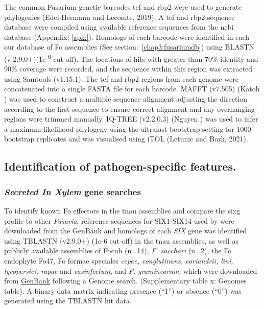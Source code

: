 The common Fusarium genetic barcodes \ac{tef} and \ac{rbp2} were used to generate phylogenies (Edel-Hermann and Lecomte, 2019). A \ac{tef} and \ac{rbp2} sequence database were compiled using available reference sequences from the \ac{ncbi} database (Appendix; \ref{apx:}). Homologs of each barcode were identified in each our database of \ac{Fo} assemblies (See section:~\ref{chap3:fusariumdb}) using BLASTN (v 2.9.0+)(1e-\textsuperscript{6} cut-off). The locations of hits with greater than 70\% identity and 90\% coverage were recorded, and the sequence within this region was extracted using Samtools (v1.15.1). The \ac{tef} and \ac{rbp2} regions from each genome were concatenated into a single FASTA file for each barcode. MAFFT (v7.505) (Katoh ) was used to construct a multiple sequence alignment adjusting the direction according to the first sequence to ensure correct alignment and any overhanging regions were trimmed manually. IQ-TREE (v2.2.0.3) (Nguyen ) was used to infer a maximum-likelihood phylogeny using the ultrafast bootstrap setting for 1000 bootstrap replicates and was visualised using iTOL (Letunic and Bork, 2021). 

\subsection{Identification of pathogen-specific features.}

\subsubsection{\textit{Secreted In Xylem} gene searches}

To identify known \acs{Fo} effectors in the \ac{tnau} assemblies and compare the \ac{sixg} profile to other \textit{Fusaria}, reference sequences for SIX1-SIX14 used by \textcite{Czislowski2018} were downloaded from the GenBank and homologs of each \textit{SIX} gene was identified using TBLASTN (v2.9.0+) (1e-6 cut-off) in the \ac{tnau} assemblies, as well as publicly available assemblies of \ac{Focub} (n=14), \textit{F. sacchari} (n=2), the \ac{Fo} endophyte Fo47, \ac{Fo} formae speciales \textit{cepae, conglutinans, coriandrii, lini, lycopersici,  rapae} and \textit{vasinfectum}, and \textit{F. graminearum}, which were downloaded from \href{https://www.ncbi.nlm.nih.gov/data-hub/genome/}{GenBank} following a Genome search. (Supplementary table x: Genomes table). A binary data matrix indicating presence (“1”) or absence (“0”) was generated using the TBLASTN hit data.

